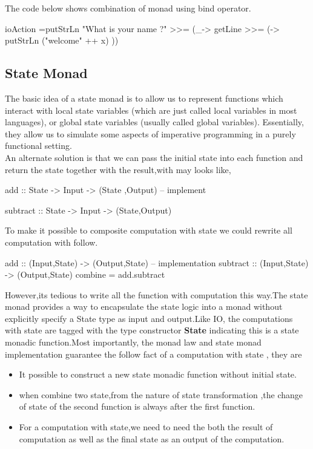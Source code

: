 The code below shows combination of monad using bind operator.
\begin{hcode}
ioAction 
  =putStrLn "What is your name ?"
	 >>= (_-> getLine >>= 
		(\x -> putStrLn ("welcome" ++ x) ))
\end{hcode}



\subsection{State Monad}
The basic idea of a state monad is to allow us to represent functions which interact with local state variables (which are just called local variables in most languages), or global state variables (usually called global variables). Essentially, they allow us to simulate some aspects of imperative programming in a purely functional setting.\\

An alternate solution is that we can pass the initial state into each function and return the state together with the result,with may looks like,
\begin{hcode}
add :: State -> Input -> (State ,Output)
-- implement

subtract :: State -> Input -> (State,Output)
\end{hcode}


To make it possible to composite computation with state we could rewrite all computation with follow.

\begin{hcode}
add :: (Input,State) -> (Output,State)
-- implementation 
subtract :: (Input,State) -> (Output,State)
combine = add.subtract 
\end{hcode}

However,its tedious to write all the function with computation this way.The state monad provides a way to encapsulate the state logic into a monad without explicitly specify a State type as input and output.Like IO, the computations with state  are tagged with the type constructor \textbf{State} indicating this is a state monadic function.Most importantly, the monad law and state monad implementation guarantee the follow fact of a computation with state , they are

\begin{itemize}
\item It possible to construct a new state monadic function without initial state.
\item when combine two state,from the nature of state transformation ,the change of state of  the second function is always after the first function.
\item For a computation with state,we need to need the both the result of computation as well as the final state as an output of the computation.
\end{itemize}

